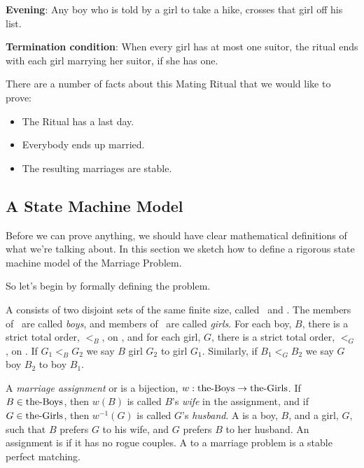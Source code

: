 \textbf{Evening}: Any boy who is told by a girl to take a hike, crosses that
girl off his list.

\textbf{Termination condition}: When every girl has at most one suitor,
the ritual ends with each girl marrying her suitor, if she has one.


There are a number of facts about this Mating Ritual that we would like to
prove:

\begin{itemize}
\item The Ritual has a last day.
\item Everybody ends up married.
\item The resulting marriages are stable.
\end{itemize}

\subsection{A State Machine Model}

Before we can prove anything, we should have clear mathematical
definitions of what we're talking about.  In this section we sketch how to
define a rigorous state machine model of the Marriage Problem.

So let's begin by formally defining the problem.

\begin{definition}
A  consists of two disjoint sets of the same finite
size, called \boys\ and \girls.  The members of \boys\ are called
\emph{boys}, and members of \girls\ are called \emph{girls}.  For each
boy, $B$, there is a strict total order, $<_B$, on \girls, and for each
girl, $G$, there is a strict total order, $<_G$, on \boys.  If $G_1 <_B
G_2$ we say $B$  girl $G_2$ to girl $G_1$.  Similarly, if
$B_1 <_G B_2$ we say $G$  boy $B_2$ to boy $B_1$.

A \emph{marriage assignment} or  is a bijection,
$w:\text{the-Boys} \to \text{the-Girls}$.  If $B \in \text{the-Boys}$, then $w(B)$ is called $B$'s
\emph{wife} in the assignment, and if $G \in \text{the-Girls}$, then $w^{-1}(G)$ is
called $G$'s \emph{husband}.  A  is a boy, $B$, and a
girl, $G$, such that $B$ prefers $G$ to his wife, and $G$ prefers $B$ to
her husband.  An assignment is  if it has no rogue couples.
A  to a marriage problem is a stable perfect matching.
\end{definition}

